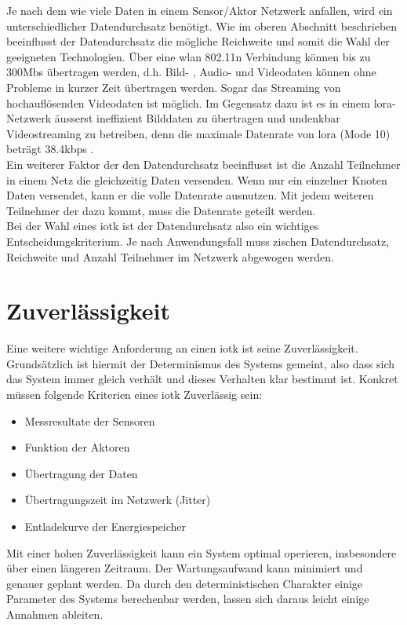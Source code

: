Je nach dem wie viele Daten in einem Sensor/Aktor Netzwerk anfallen, wird ein unterschiedlicher Datendurchsatz benötigt. Wie im oberen Abschnitt beschrieben beeinflusst der Datendurchsatz die mögliche Reichweite und somit die Wahl der geeigneten Technologien. Über eine \gls{wlan} 802.11n Verbindung können bis zu 300Mbs übertragen werden, d.h. Bild- , Audio- und Videodaten können ohne Probleme in kurzer Zeit übertragen werden. Sogar das Streaming von hochauflösenden Videodaten ist möglich. Im Gegensatz dazu ist es in einem \gls{lora}-Netzwerk äusserst ineffizient Bilddaten zu übertragen und undenkbar Videostreaming zu betreiben, denn die maximale Datenrate von \gls{lora} (Mode 10) beträgt 38.4kbps \autocite[2]{lora:FAQ}.\\
Ein weiterer Faktor der den Datendurchsatz beeinflusst ist die Anzahl Teilnehmer in einem Netz die gleichzeitig Daten versenden. Wenn nur ein einzelner Knoten Daten versendet, kann er die volle Datenrate ausnutzen. Mit jedem weiteren Teilnehmer der dazu kommt, muss die Datenrate geteilt werden.\\
Bei der Wahl eines \gls{iotk} ist der Datendurchsatz also ein wichtiges Entscheidungskriterium. Je nach Anwendungsfall muss zischen Datendurchsatz, Reichweite und Anzahl Teilnehmer im Netzwerk abgewogen werden.

\section{Zuverlässigkeit}

Eine weitere wichtige Anforderung an einen \gls{iotk} ist seine Zuverlässigkeit. Grundsätzlich ist hiermit der Determinismus des Systems gemeint, also dass sich das System immer gleich verhält und dieses Verhalten klar bestimmt ist. Konkret müssen folgende Kriterien eines \gls{iotk} Zuverlässig sein:
\begin{itemize}  
  \item Messresultate der Sensoren
  \item Funktion der Aktoren
  \item Übertragung der Daten
  \item Übertragungszeit im Netzwerk (Jitter)
  \item Entladekurve der Energiespeicher
\end{itemize}

Mit einer hohen Zuverlässigkeit kann ein System optimal operieren, insbesondere über einen längeren Zeitraum. Der Wartungsaufwand kann minimiert und genauer geplant werden. Da durch den deterministischen Charakter einige Parameter des Systems berechenbar werden, lassen sich daraus leicht einige Annahmen ableiten.

